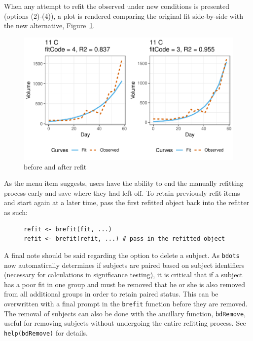 \documentclass{article}
\newcommand{\xt}{\texttt}%
\begin{document}
When any attempt to refit the observed under new conditions is presented (options (2)-(4)), a plot is rendered comparing the original fit side-by-side with the new alternative, Figure~\ref{fig:refit_plot}.

\begin{figure}[H]
\centering
\includegraphics{img/mouse_refit_plot.pdf}
\caption{before and after refit}
\label{fig:refit_plot}
\end{figure}

As the menu item suggests, users have the ability to end the manually refitting process early and save where they had left off. To retain previously refit items and start again at a later time, pass the first refitted object back into the refitter as such:

\begin{singlespace}
\begin{figure}[H]
\centering
\begin{BVerbatim}
refit <- brefit(fit, ...)
refit <- brefit(refit, ...) # pass in the refitted object
\end{BVerbatim}
\end{figure}
\end{singlespace}



A final note should be said regarding the option to delete a subject. As \xt{bdots} now automatically determines if subjects are paired based on subject identifiers (necessary for  calculations in significance testing), it is critical that if a subject has a poor fit in one group and must be removed that he or she is also removed from all additional groups in order to retain paired status. This can be overwritten with a final prompt in the \texttt{brefit} function before they are removed. The removal of subjects can also be done with the ancillary function, \texttt{bdRemove}, useful for removing subjects without undergoing the entire refitting process. See \xt{help(bdRemove)} for details.
\end{document}

